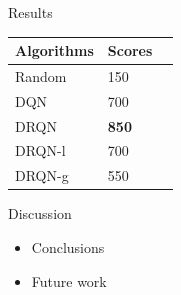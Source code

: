 \documentclass[final]{beamer}
\newlength{\onecolwid}
\begin{document}
\begin{frame}[t]
\begin{columns}[t]
\begin{column}{\onecolwid}
\begin{block}{Results}
\begin{table}
    \vspace{2ex}
    \begin{tabular}{l l l}
        \toprule
            \textbf{Algorithms} & \textbf{Scores} \\
        \midrule
            Random & 150 \\
            DQN & 700 \\
            DRQN & \textbf{850} \\
            DRQN-l & 700 \\
            DRQN-g & 550 \\
        \bottomrule
    \end{tabular}
\end{table}

\end{block}


\begin{block}{Discussion}

    \begin{itemize}
        \item Conclusions
        \item Future work
    \end{itemize}

\end{block}


\end{column} %

\end{columns} %

\end{frame} %
\end{document}

